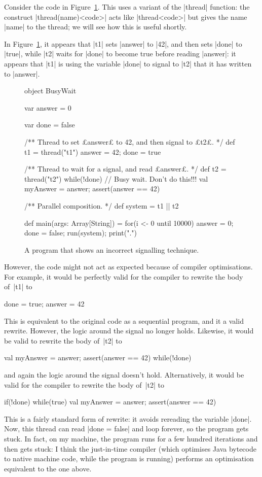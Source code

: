 Consider the code in Figure~\ref{fig:busyWait}.  This uses a variant of the
|thread| function: the construct |thread(name){<code>}| acts like
|thread{<code>}|  but gives the name |name| to the thread; we will see how
this is useful shortly.

In Figure~\ref{fig:busyWait}, it appears that |t1| sets |answer| to |42|, and
then sets |done| to |true|, while |t2| waits for |done| to become true before
reading |answer|: it appears that |t1| is using the variable |done| to signal
to |t2| that it has written to |answer|.

\begin{figure}
\begin{scala}
object BusyWait{
  var answer = 0

  var done = false

  /** Thread to set £answer£ to 42, and then signal to £t2£. */
  def t1 = thread("t1"){ answer = 42; done = true }

  /** Thread to wait for a signal, and read £answer£. */
  def t2 = thread("t2"){
    while(!done){ } // Busy wait.  Don't do this!!!
    val myAnswer = answer; assert(answer == 42)
  }

  /** Parallel composition. */
  def system = t1 || t2

  def main(args: Array[String]) = { 
    for(i <- 0 until 10000){ answer = 0; done = false; run(system); print(".") }
  }
}
\end{scala}
\caption{A program that shows an incorrect signalling technique.}
\label{fig:busyWait}
\end{figure}

However, the code might not act as expected because of compiler
optimisations.  For example, it would be perfectly valid for the compiler to
rewrite the body of~|t1| to
\begin{scala}
  done = true; answer = 42
\end{scala}
%
This is equivalent to the original code as a sequential program, and it a
valid rewrite.  However, the logic around the signal no longer holds.
Likewise, it would be valid to rewrite the body of~|t2| to
\begin{scala}
  val myAnswer = answer; assert(answer == 42)
  while(!done){ } 
\end{scala}
and again the logic around the signal doesn't hold.  Alternatively, it would
be valid for the compiler to rewrite the body of~|t2| to
% 
\begin{scala}
  if(!done){ while(true){ } }
  val myAnswer = answer; assert(answer == 42)
\end{scala}
This is a fairly standard form of rewrite: it avoids rereading the variable
|done|.  Now, this thread can read |done = false| and loop forever, so the
program gets stuck.  In fact, on my machine, the program runs for a few
hundred iterations and then gets stuck: I think the just-in-time compiler
(which optimises Java bytecode to native machine code, while the program is
running) performs an optimisation equivalent to the one above.


